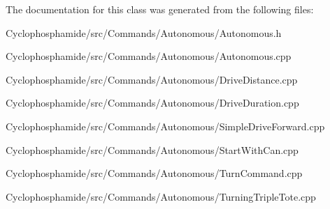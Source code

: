 The documentation for this class was generated from the following files\+:\begin{DoxyCompactItemize}
\item 
Cyclophosphamide/src/\+Commands/\+Autonomous/Autonomous.\+h\item 
Cyclophosphamide/src/\+Commands/\+Autonomous/Autonomous.\+cpp\item 
Cyclophosphamide/src/\+Commands/\+Autonomous/Drive\+Distance.\+cpp\item 
Cyclophosphamide/src/\+Commands/\+Autonomous/Drive\+Duration.\+cpp\item 
Cyclophosphamide/src/\+Commands/\+Autonomous/Simple\+Drive\+Forward.\+cpp\item 
Cyclophosphamide/src/\+Commands/\+Autonomous/Start\+With\+Can.\+cpp\item 
Cyclophosphamide/src/\+Commands/\+Autonomous/Turn\+Command.\+cpp\item 
Cyclophosphamide/src/\+Commands/\+Autonomous/Turning\+Triple\+Tote.\+cpp\end{DoxyCompactItemize}
